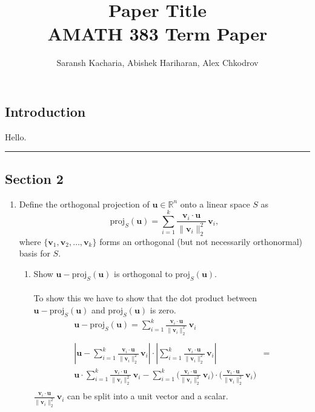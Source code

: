 \documentclass{article}
\title{Paper Title\\[1ex] \normalsize AMATH 383 Term Paper}
\date{}
\author{Saransh Kacharia, Abishek Hariharan, Alex Chkodrov}
\begin{document}
\maketitle

\subsection*{Introduction} Hello. \\
\hrule

\subsection*{Section 2}

\begin{enumerate}	
\item Define the orthogonal projection of $\mathbf{u} \in \mathbb{R}^n$ onto a linear space $S$ as
\[ \text{proj}_{S} (\mathbf{u}) = \sum_{i=1}^k \frac{\mathbf{v}_i \cdot \mathbf{u}}{\| \mathbf{v}_i \|_2^2} \, \mathbf{v}_i, \]
where $\{ \mathbf{v}_1, \mathbf{v}_2, \dots, \mathbf{v}_k \}$ forms an orthogonal (but not necessarily orthonormal) basis for $S$.
	\begin{enumerate}
	\item Show $\mathbf{u} - \text{proj}_S(\mathbf{u})$ is orthogonal to $\text{proj}_S(\mathbf{u})$. \\
	\\
	To show this we have to show that the dot product between $\mathbf{u} - \text{proj}_S(\mathbf{u})$ and $\text{proj}_S(\mathbf{u})$ is zero.
	\begin{align*}
		\mathbf{u} - \text{proj}_{S} (\mathbf{u}) = \sum_{i=1}^k \frac{\mathbf{v}_i \cdot \mathbf{u}}{\| \mathbf{v}_i \|_2^2} \, \mathbf{v}_i \\
		\\
		|\mathbf{u} - \sum_{i=1}^k \frac{\mathbf{v}_i \cdot \mathbf{u}}{\| \mathbf{v}_i \|_2^2} \, \mathbf{v}_i| \cdot |\sum_{i=1}^k \frac{\mathbf{v}_i \cdot \mathbf{u}}{\| \mathbf{v}_i \|_2^2} \, \mathbf{v}_i|  &= \\
		\mathbf{u} \cdot \sum_{i=1}^k \frac{\mathbf{v}_i \cdot \mathbf{u}}{\| \mathbf{v}_i \|_2^2} \, \mathbf{v}_i - \sum_{i=1}^k \bigg(\frac{\mathbf{v}_i \cdot \mathbf{u}}{\| \mathbf{v}_i \|_2^2} \, \mathbf{v}_i\bigg) \cdot \bigg(\frac{\mathbf{v}_i \cdot \mathbf{u}}{\| \mathbf{v}_i \|_2^2} \, \mathbf{v}_i\bigg) \\
	\end{align*}
	$\frac{\mathbf{v}_i \cdot \mathbf{u}}{\| \mathbf{v}_i \|_2^2} \, \mathbf{v}_i$ can be split into a unit vector and a scalar. \\

\end{enumerate}
\end{enumerate}
\end{document}
